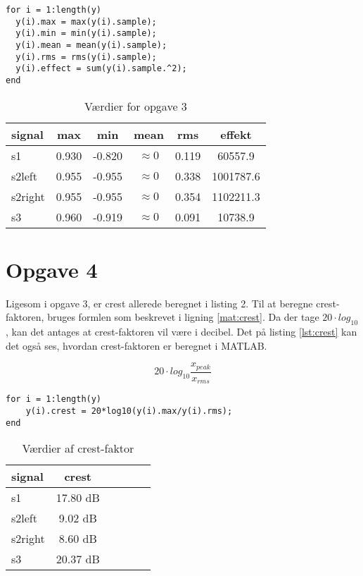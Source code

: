 \documentclass[../main.tex]{subfiles}
\begin{document}
\begin{lstlisting}[caption={Udsnit af beregning af max, min, gennemsnit (mean), rms og effekt}, label=lst:opg3]
for i = 1:length(y)
  y(i).max = max(y(i).sample);
  y(i).min = min(y(i).sample);
  y(i).mean = mean(y(i).sample);
  y(i).rms = rms(y(i).sample);
  y(i).effect = sum(y(i).sample.^2);
end
\end{lstlisting}

\begin{table}[H]
	\centering
	\caption{Værdier for opgave 3}
	\begin{tabular}{l|ccccc}
		\hline
		signal & max & min & mean & rms & effekt \\
		\hline
		s1 & 0.930 & -0.820 & $\approx 0$ & 0.119 & 60557.9 \\
		s2left & 0.955 & -0.955 & $\approx 0$ & 0.338 & 1001787.6  \\ 
		s2right & 0.955 & -0.955 & $\approx 0$ &	0.354 &	1102211.3 \\
		s3 & 0.960 &	-0.919 & $\approx 0$ & 0.091 &	10738.9 \\
	\end{tabular}
\end{table}


\section{Opgave 4}

Ligesom i opgave 3, er crest allerede beregnet i listing 2. Til at beregne crest-faktoren, bruges formlen som beskrevet i ligning \ref{mat:crest}. Da der tage \(20\cdot log_{10}\), kan det antages at crest-faktoren vil være i decibel. Det på listing \ref{lst:crest} kan det også ses, hvordan crest-faktoren er beregnet i MATLAB. 

\begin{equation}
	\label{mat:crest}
	20\cdot log_{10}\frac{x_{peak}}{x_{rms}}
\end{equation}

\begin{lstlisting}[caption={Bergning af crest-faktor for alle 3 signaler}, label=lst:crest]
for i = 1:length(y)
	y(i).crest = 20*log10(y(i).max/y(i).rms);
end
\end{lstlisting}

\begin{table}[H]
	\centering
	\caption{Værdier af crest-faktor}
	\label{tab:crest}
	\begin{tabular}{l|ccccc}
		\hline
		signal & crest \\
		\hline
		s1 & 17.80 dB \\
		s2left & 9.02 dB \\ 
		s2right & 8.60 dB\\
		s3 & 20.37 dB
	\end{tabular}
\end{table}
\end{document}
